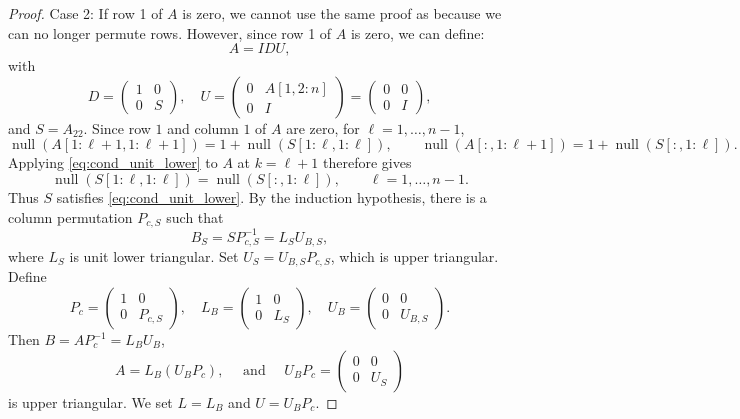 \documentclass[final]{siamart1116}
\numberwithin{theorem}{section}
\DeclareMathOperator{\nl}{null}
\begin{document}
\begin{proof}
  Case 2: If row 1 of $A$ is zero, we cannot use the same proof as  because we can no longer permute rows. However, since row 1 of $A$ is zero, we can define:
  \[
    A = IDU,
  \]
  with
  \[
    D =
    \begin{pmatrix}
      1 & 0 \\
      0 & S
    \end{pmatrix}, \quad
    U =
    \begin{pmatrix}
      0 & A[1,2:n] \\
      0 & I
    \end{pmatrix} =
    \begin{pmatrix}
      0 & 0 \\
      0 & I
    \end{pmatrix},
  \]
  and $S=A_{22}$. Since row $1$ and column $1$ of $A$ are zero, for $\ell=1,\ldots,n-1$,
  \[
    \nl(A[1:\ell+1,1:\ell+1])
    =
    1+\nl(S[1:\ell,1:\ell]),
    \qquad
    \nl(A[:,1:\ell+1])
    =
    1+\nl(S[:,1:\ell]).
  \]
  Applying \cref{eq:cond_unit_lower} to $A$ at $k=\ell+1$ therefore gives
  \[
    \nl(S[1:\ell,1:\ell]) = \nl(S[:,1:\ell]),
    \qquad \ell=1,\ldots,n-1.
  \]
  Thus $S$ satisfies \cref{eq:cond_unit_lower}. By the induction hypothesis, there is a column permutation $P_{c,S}$ such that
  \[
    B_S = S P_{c,S}^{-1} = L_S U_{B,S},
  \]
  where $L_S$ is unit lower triangular. Set $U_S = U_{B,S}P_{c,S}$, which is upper triangular. Define
  \[
    P_c =
    \begin{pmatrix}
      1 & 0       \\
      0 & P_{c,S}
    \end{pmatrix}, \quad
    L_B =
    \begin{pmatrix}
      1 & 0   \\
      0 & L_S
    \end{pmatrix}, \quad
    U_B =
    \begin{pmatrix}
      0 & 0       \\
      0 & U_{B,S}
    \end{pmatrix}.
  \]
  Then $B = A P_c^{-1}=L_B U_B$,
  \[
    A = L_B(U_B P_c), \quad \text{ and } \quad
    U_B P_c =
    \begin{pmatrix}
      0 & 0   \\
      0 & U_S
    \end{pmatrix}
  \]
  is upper triangular. We set $L=L_B$ and $U=U_B P_c$.


\end{proof}
\end{document}
